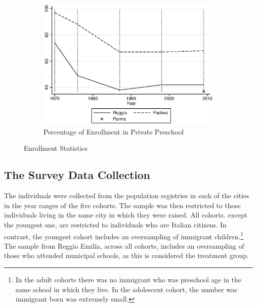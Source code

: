 \begin{figure}[H]
\begin{subfigure}[ht]{0.48\textwidth}
        \includegraphics[width=\textwidth]{../../output/image/enroll_per_priv_graph.eps}
        \caption{Percentage of Enrollment in Private Preschool}
        \label{fig:large}
      \end{subfigure}
      \caption{Enrollment Statistics}  \label{fig:enrollment}
    \end{figure}


\subsection{The Survey Data Collection}

The individuals were collected from the population registries in each of the cities in the year ranges of the five cohorts. The sample was then restricted to those individuals living in the same city in which they were raised. All cohorts. except the youngest one, are restricted to individuals who are Italian citizens. In contrast, the youngest cohort includes an oversampling of immigrant children.\footnote{In the adult cohorts there was no immigrant who was preschool age in the same school in which they live. In the adolescent cohort, the number was immigrant born was extremely small.} The sample from Reggio Emilia, across all cohorts, includes an oversampling of those who attended municipal schools, as this is considered the treatment group.

